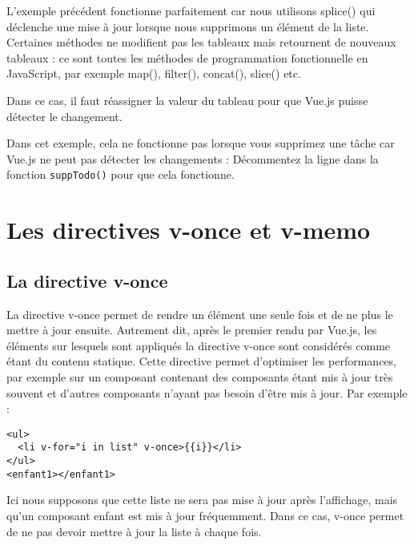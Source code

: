 L'exemple précédent fonctionne parfaitement car nous utilisons {\color{monOrange}splice()} qui déclenche une mise à jour lorsque nous supprimons un élément de la liste. Certaines méthodes ne modifient pas les tableaux mais retournent de nouveaux tableaux : ce sont toutes les méthodes de programmation fonctionnelle en JavaScript, par exemple {\color{monOrange} map(), filter(), concat(), slice()} etc.

Dans ce cas, il faut réassigner la valeur du tableau pour que {\color{monOrange}Vue.js} puisse détecter le changement.

Dans cet exemple, cela ne fonctionne pas lorsque vous supprimez une tâche car {\color{monOrange}Vue.js} ne peut pas détecter les changements : Décommentez la ligne dans la fonction {\tt suppTodo()} pour que cela fonctionne.


\section{Les directives v-once et v-memo}
\subsection{La directive {\color{monOrange}v-once}}
La directive {\color{monOrange}v-once} permet de rendre un élément une seule fois et de ne plus le mettre à jour ensuite. Autrement dit, après le premier rendu par {\color{monOrange}Vue.js}, les éléments sur lesquels sont appliqués la directive {\color{monOrange}v-once} sont considérés comme étant du contenu statique. Cette directive permet d'optimiser les performances, par exemple sur un composant contenant des composants étant mis à jour très souvent et d'autres composants n'ayant pas besoin d'être mis à jour. Par exemple :
\begin{verbatim}
<ul>
  <li v-for="i in list" v-once>{{i}}</li>
</ul>
<enfant1></enfant1>
\end{verbatim}
Ici nous supposons que cette liste ne sera pas mise à jour après l'affichage, mais qu'un composant enfant est mis à jour fréquemment. Dans ce cas, {\color{monOrange}v-once} permet de ne pas devoir mettre à jour la liste à chaque fois.


